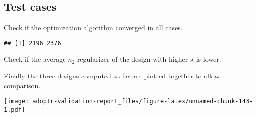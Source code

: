 \documentclass[]{book}
\newenvironment{Shaded}{\begin{snugshade}}{\end{snugshade}}
\newcommand{\ControlFlowTok}[1]{\textcolor[rgb]{0.13,0.29,0.53}{\textbf{#1}}}
\newcommand{\DecValTok}[1]{\textcolor[rgb]{0.00,0.00,0.81}{#1}}
\newcommand{\KeywordTok}[1]{\textcolor[rgb]{0.13,0.29,0.53}{\textbf{#1}}}
\newcommand{\NormalTok}[1]{#1}
\newcommand{\OperatorTok}[1]{\textcolor[rgb]{0.81,0.36,0.00}{\textbf{#1}}}
\newcommand{\StringTok}[1]{\textcolor[rgb]{0.31,0.60,0.02}{#1}}
\begin{document}
\hypertarget{test-cases-13}{%
\subsection{Test cases}\label{test-cases-13}}

Check if the optimization algorithm converged in all cases.

\begin{Shaded}
\end{Shaded}

\begin{verbatim}
## [1] 2196 2376
\end{verbatim}

\begin{Shaded}
\end{Shaded}

Check if the average \(n_2\) regularizer of the design with
higher \(\lambda\) is lower.

\begin{Shaded}
\end{Shaded}

Finally the three designs computed so far are plotted together to allow
comparison.

\texttt{[image: adoptr-validation-report\_files/figure-latex/unnamed-chunk-143-1.pdf]}


\end{document}
